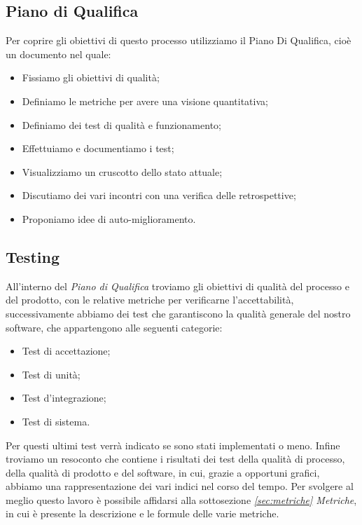   \subsection{Piano di Qualifica}
  Per coprire gli obiettivi di questo processo utilizziamo il Piano Di
  Qualifica, cioè un documento nel quale:
  \begin{itemize}
      \item Fissiamo gli obiettivi di qualità;
      \item Definiamo le metriche per avere una visione quantitativa;
      \item Definiamo dei test di qualità e funzionamento;
      \item Effettuiamo e documentiamo i test;
      \item Visualizziamo un cruscotto dello stato attuale;
      \item Discutiamo dei vari incontri con una verifica delle retrospettive;
      \item Proponiamo idee di auto-miglioramento.
  \end{itemize}

  \subsection{Testing}
  All'interno del \textit{Piano di Qualifica} troviamo gli obiettivi di qualità del processo e del prodotto, con le relative metriche per verificarne l'accettabilità, successivamente abbiamo dei test che garantiscono la qualità generale del nostro software, che appartengono alle seguenti categorie:
  \begin{itemize}
      \item Test di accettazione;
      \item Test di unità;
      \item Test d'integrazione;
      \item Test di sistema.
  \end{itemize}
  Per questi ultimi test verrà indicato se sono stati implementati o meno.
  \newline
  Infine troviamo un resoconto che contiene i risultati dei test della qualità di processo, della qualità di prodotto e del software, in cui, grazie a opportuni grafici, abbiamo una rappresentazione dei vari indici nel corso del tempo. Per svolgere al meglio questo lavoro è possibile affidarsi alla sottosezione \textit{\ref{sec:metriche} Metriche}, in cui è presente la descrizione e le formule delle varie metriche.


